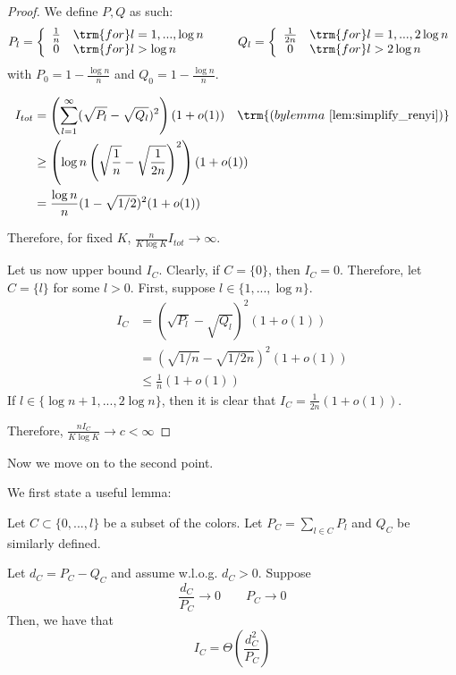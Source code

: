 \documentclass{article}
\begin{document}
\begin{proof}
We define $P, Q$ as such:
\[
P_l = \left\{ \begin{array}{cl} 
        \frac{1}{n}  & \trm{for } l = 1,..., \log n \\
        0 & \trm{for } l > \log n 
     \end{array} \right. 
\qquad
Q_l = \left\{ \begin{array}{cl}
        \frac{1}{2n} & \trm{for } l = 1,..., 2\log n\\
        0 & \trm{for } l > 2\log n 
        \end{array} \right.
\]
with $P_0 = 1 - \frac{\log n}{n}$ and $Q_0 = 1 - \frac{\log n}{n}$. 

\begin{align*}
I_{tot} &= \left( \sum_{l=1}^\infty (\sqrt{P_l} - \sqrt{Q_l} )^2 \right) (1 + o(1)) 
  \quad   \trm{(by lemma~\ref{lem:simplify_renyi})} \\
&\geq \left( 
    \log n \left( \sqrt{ \frac{1}{n}} - \sqrt{\frac{1}{2n}} \right)^2  \right) (1+o(1)) \\
&= \frac{\log n}{n} (1 - \sqrt{1/2})^2 (1 + o(1)) 
\end{align*}

Therefore, for fixed $K$, $\frac{n}{K \log K} I_{tot} \rightarrow \infty$. 

Let us now upper bound $I_C$. Clearly, if $C=\{0\}$, then $I_C = 0$. Therefore, let $C = \{l\}$ for some $l > 0$. First, suppose $l \in \{ 1 ,..., \log n\}$. 
\begin{align*}
I_C &= (\sqrt{P_l} - \sqrt{Q_l})^2 (1 + o(1)) \\
 &= ( \sqrt{1/n} - \sqrt{1/2n} )^2 (1 + o(1)) \\
 &\leq \frac{1}{n} (1 + o(1)) 
\end{align*}
If $ l \in \{\log n+1,..., 2 \log n\}$, then it is clear that $I_C = \frac{1}{2n} (1 + o(1))$. 

Therefore, $\frac{n I_C}{K \log K} \rightarrow c < \infty$ 


\end{proof}

Now we move on to the second point.

We first state a useful lemma:

\begin{lemma}
\label{lem:Ic_characterization}
Let $C \subset \{0,...,l\}$ be a subset of the colors. Let $P_C = \sum_{l \in C} P_l$ and $Q_C$ be similarly defined.

Let $d_C = P_C - Q_C$ and assume w.l.o.g. $d_C > 0$. Suppose 
\[
\frac{d_C}{P_C} \rightarrow 0 \qquad P_C \rightarrow 0
\]
Then, we have that
\[
I_C = \Theta \left( \frac{d_C^2}{P_C} \right)
\]


\end{lemma}
\end{document}
